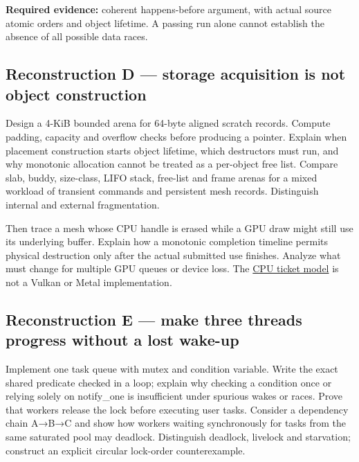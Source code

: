 \textbf{Required evidence:} coherent happens-before argument, with actual source atomic orders and object lifetime. A passing run alone cannot establish the absence of all possible data races.

\subsection{Reconstruction D --- storage acquisition is not object construction}\label{appendix-2587680a4fe3-reconstruction-d-storage-acquisition-is-not-object-construction}

\hypertarget{appendix-2587680a4fe3-reconstruction-d-storage-acquisition-is-not-object-construction}{}

Design a 4-KiB bounded arena for 64-byte aligned scratch records. Compute padding, capacity and overflow checks before producing a pointer. Explain when placement construction starts object lifetime, which destructors must run, and why monotonic allocation cannot be treated as a per-object free list. Compare slab, buddy, size-class, LIFO stack, free-list and frame arenas for a mixed workload of transient commands and persistent mesh records. Distinguish internal and external fragmentation.

Then trace a mesh whose CPU handle is erased while a GPU draw might still use its underlying buffer. Explain how a monotonic completion timeline permits physical destruction only after the actual submitted use finishes. Analyze what must change for multiple GPU queues or device loss. The \hyperref[source-file-0060a91bd24dd25d6c14e679]{CPU ticket model} is not a Vulkan or Metal implementation.

\subsection{Reconstruction E --- make three threads progress without a lost wake-up}\label{appendix-2587680a4fe3-reconstruction-e-make-three-threads-progress-without-a-lost-wake-up}

\hypertarget{appendix-2587680a4fe3-reconstruction-e-make-three-threads-progress-without-a-lost-wake-up}{}

Implement one task queue with mutex and condition variable. Write the exact shared predicate checked in a loop; explain why checking a condition once or relying solely on notify\_one is insufficient under spurious wakes or races. Prove that workers release the lock before executing user tasks. Consider a dependency chain A→B→C and show how workers waiting synchronously for tasks from the same saturated pool may deadlock. Distinguish deadlock, livelock and starvation; construct an explicit circular lock-order counterexample.

